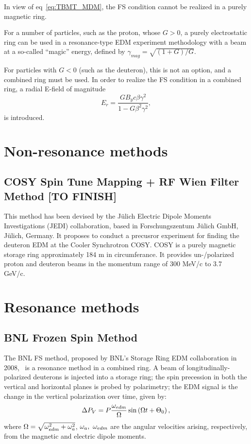 \documentclass{article}
\begin{document}
In view of eq~\eqref{eq:TBMT_MDM}, the FS condition cannot be realized in a purely magnetic ring.

For a number of particles, such as the proton, whose $G>0$, a purely electrostatic ring can be used in a resonance-type EDM experiment methodology with a beam at a so-called ``magic'' energy, defined by $\gamma_{mag} = \sqrt{(1+G)/G}$.

For particles with $G<0$ (such as the deuteron), this is not an option, and a combined ring must be used. In order to realize the FS condition in a combined ring, a radial E-field of magnitude
\begin{equation}\label{eq:FS_Er}
  E_r = \frac{GB_yc\beta\gamma^2}{1-G\beta^2\gamma^2},
\end{equation}
is introduced.~\cite{BNL:Deuteron2008}

\section{Non-resonance methods}

\subsection{COSY Spin Tune Mapping + RF Wien Filter Method [TO FINISH]}
This method has been devised by the J\"ulich Electric Dipole Moments Investigations (JEDI) collaboration, based in Forschungszentum J\"ulich GmbH, J\"ulich, Germany. It proposes to conduct a precusror experiment for finding the deuteron EDM at the Cooler Synchrotron COSY. COSY is a purely magnetic storage ring approximately 184 m in circumferance. It provides un-/polarized proton and deuteron beams in the momentum range of 300 MeV/c to 3.7 GeV/c.~\cite{COSY:ElectronCooling}

\section{Resonance methods}

\subsection{BNL Frozen Spin Method}
The BNL FS method, proposed by BNL's Storage Ring EDM collaboration in 2008,~\cite{BNL:Deuteron2008} is a resonance method in a combined ring. A beam of longitudinally-polarized deuterons is injected into a storage ring; the spin precession in both the vertical and horizontal planes  is probed by polarimetry; the EDM signal is the change in the vertical polarization over time, given by:~\cite[p. 8]{BNL:Deuteron2008}
\begin{equation}
  \Delta P_V = P\frac{\w_{edm}}{\W}\sin\bkt{\W t + \Theta_0},
\end{equation}
where $\Omega = \sqrt{\omega_{edm}^2 + \omega_a^2}$, $\omega_a,~\omega_{edm}$ are the angular velocities arising, respectively, from the magnetic and electric dipole moments.
\end{document}
